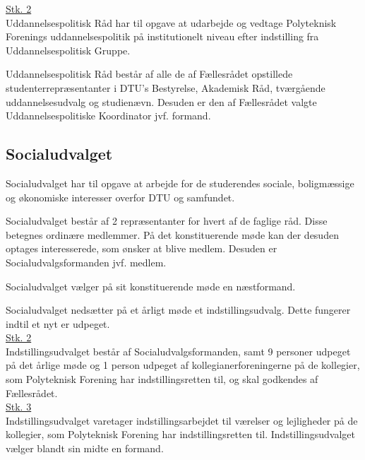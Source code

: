 \begin{list}
\underline{Stk. 2}\\
Uddannelsespolitisk Råd har til opgave at udarbejde og vedtage Polyteknisk Forenings uddannelsespolitik på institutionelt niveau efter indstilling fra Uddannelsespolitisk Gruppe.\\

\item Uddannelsespolitisk Råd består af alle de af Fællesrådet opstillede studenterrepræsentanter i DTU’s Bestyrelse, Akademisk Råd, tværgående uddannelsesudvalg og studienævn. Desuden er den af Fællesrådet valgte Uddannelsespolitiske Koordinator jvf.  formand.\\

\subsection{Socialudvalget}
\label{L:kap:socialudvalg}
\item Socialudvalget har til opgave at arbejde for de studerendes sociale, boligmæssige og økonomiske interesser overfor DTU og samfundet.\\

\item Socialudvalget består af 2 repræsentanter for hvert af de faglige råd. Disse betegnes ordinære medlemmer. På det konstituerende møde kan der desuden optages interesserede, som ønsker at blive medlem. Desuden er Socialudvalgsformanden jvf.  medlem.\\

\item Socialudvalget vælger på sit konstituerende møde en næstformand.\\

\item Socialudvalget nedsætter på et årligt møde et indstillingsudvalg. Dette fungerer indtil et nyt er udpeget.\\

\underline{Stk. 2} \\
Indstillingsudvalget består af Socialudvalgsformanden, samt 9 personer udpeget på det årlige møde og 1 person udpeget af kollegianerforeningerne på de kollegier, som Polyteknisk Forening har indstillingsretten til, og skal godkendes af Fællesrådet.\\

\underline{Stk. 3} \\
Indstillingsudvalget varetager indstillingsarbejdet til værelser og lejligheder på de kollegier, som Polyteknisk Forening har indstillingsretten til. Indstillingsudvalget vælger blandt sin midte en formand.




\end{list}
